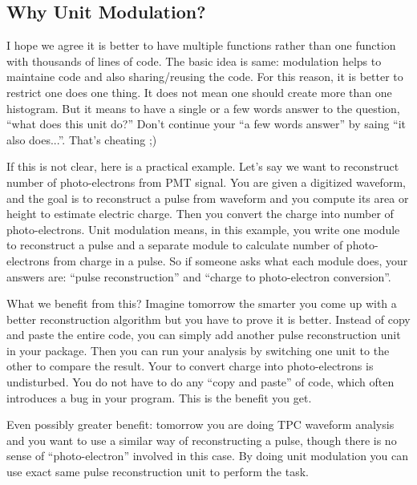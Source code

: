\subsection{Why Unit Modulation?}
I hope we agree it is better to have multiple functions rather than one function with thousands of lines of code. 
The basic idea is same: modulation helps to maintaine code and also sharing/reusing the code.
For this reason, it is better to restrict one \anaunit does one thing.
It does not mean one \anaunit should create more than one histogram. 
But it means to have a single or a few words answer to the question, ``what does this unit do?''
Don't continue your ``a few words answer'' by saing ``it also does...''. That's cheating ;)

If this is not clear, here is a practical example. 
Let's say we want to reconstruct number of photo-electrons from PMT signal.
You are given a digitized waveform, and the goal is to reconstruct a pulse from waveform and you compute its area or height to estimate electric charge. Then you convert the charge into number of photo-electrons.
Unit modulation means, in this example, you write one module to reconstruct a pulse and a separate module to calculate number of photo-electrons from charge in a pulse.
So if someone asks what each module does, your answers are: ``pulse reconstruction'' and ``charge to photo-electron conversion''.

What we benefit from this? Imagine tomorrow the smarter you come up with a better reconstruction algorithm but you have to prove it is better. Instead of copy and paste the entire code, you can simply add another pulse reconstruction unit in your package. Then you can run your analysis by switching one unit to the other to compare the result. Your \anaunit to convert charge into photo-electrons is undisturbed. You do not have to do any ``copy and paste'' of code, which often introduces a bug in your program. This is the benefit you get.

Even possibly greater benefit: tomorrow you are doing TPC waveform analysis and you want to use a similar way of reconstructing a pulse, though there is no sense of ``photo-electron'' involved in this case. By doing unit modulation you can use exact same pulse reconstruction unit to perform the task.















